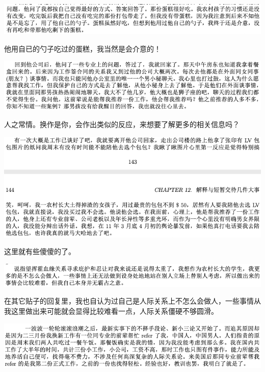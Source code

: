 \documentclass[9pt, b5paper]{article}
\begin{document}
\begin{center}
\includegraphics[width=.9\linewidth]{./pic/backups_plans_20210412_104506.png}
\end{center}

他用自已的勺子吃过的蛋糕，我当然是会介意的！

\begin{center}
\includegraphics[width=.9\linewidth]{./pic/backups_plans_20210412_104626.png}
\end{center}

人之常情。换作是你，会作出类似的反应，来想要了解更多的相关信息吗？

\begin{center}
\includegraphics[width=.9\linewidth]{./pic/backups_plans_20210412_104740.png}
\end{center}

这里就有些傻傻的了。

\begin{center}
\includegraphics[width=.9\linewidth]{./pic/backups_plans_20210412_114004.png}
\end{center}

在其它贴子的回复里，我也自认为过自己是人际关系上不怎么会做人，一些事情从我这里做出来可能就会显得比较难看一点，人际关系僵硬不够圆滑。

\begin{center}
\includegraphics[width=.9\linewidth]{./pic/backups_plans_20210412_114144.png}
\end{center}
\end{document}
